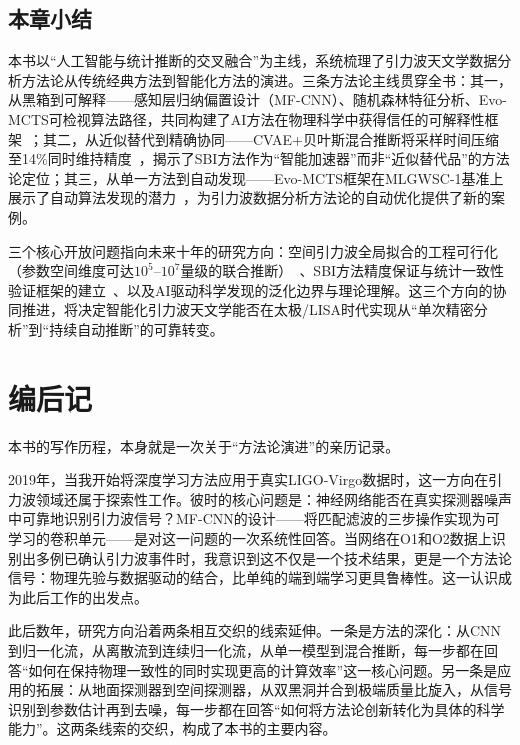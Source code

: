 \section{本章小结}

本书以“人工智能与统计推断的交叉融合”为主线，系统梳理了引力波天文学数据分析方法论从传统经典方法到智能化方法的演进。三条方法论主线贯穿全书：其一，从黑箱到可解释——感知层归纳偏置设计（MF-CNN）、随机森林特征分析、Evo-MCTS可检视算法路径，共同构建了AI方法在物理科学中获得信任的可解释性框架~\cite{wang2020deeplearning,tian2025cnn,wang2025evomcts}；其二，从近似替代到精确协同——CVAE+贝叶斯混合推断将采样时间压缩至14\%同时维持精度~\cite{sun2025cvae}，揭示了SBI方法作为“智能加速器”而非“近似替代品”的方法论定位；其三，从单一方法到自动发现——Evo-MCTS框架在MLGWSC-1基准上展示了自动算法发现的潜力~\cite{wang2025evomcts,schafer2023mlgwsc1}，为引力波数据分析方法论的自动优化提供了新的案例。

三个核心开放问题指向未来十年的研究方向：空间引力波全局拟合的工程可行化（参数空间维度可达$10^5$--$10^7$量级的联合推断）~\cite{wang2024challenges,du2026taiji}、SBI方法精度保证与统计一致性验证框架的建立~\cite{liang2026sbireview}、以及AI驱动科学发现的泛化边界与理论理解。这三个方向的协同推进，将决定智能化引力波天文学能否在太极/LISA时代实现从“单次精密分析”到“持续自动推断”的可靠转变。

\chapter*{编后记}
\ifdefined\HCode\else{}\fi

本书的写作历程，本身就是一次关于“方法论演进”的亲历记录。

2019年，当我开始将深度学习方法应用于真实LIGO-Virgo数据时，这一方向在引力波领域还属于探索性工作。彼时的核心问题是：神经网络能否在真实探测器噪声中可靠地识别引力波信号？MF-CNN的设计——将匹配滤波的三步操作实现为可学习的卷积单元——是对这一问题的一次系统性回答。当网络在O1和O2数据上识别出多例已确认引力波事件时，我意识到这不仅是一个技术结果，更是一个方法论信号：物理先验与数据驱动的结合，比单纯的端到端学习更具鲁棒性。这一认识成为此后工作的出发点。

此后数年，研究方向沿着两条相互交织的线索延伸。一条是方法的深化：从CNN到归一化流，从离散流到连续归一化流，从单一模型到混合推断，每一步都在回答“如何在保持物理一致性的同时实现更高的计算效率”这一核心问题。另一条是应用的拓展：从地面探测器到空间探测器，从双黑洞并合到极端质量比旋入，从信号识别到参数估计再到去噪，每一步都在回答“如何将方法论创新转化为具体的科学能力”。这两条线索的交织，构成了本书的主要内容。

